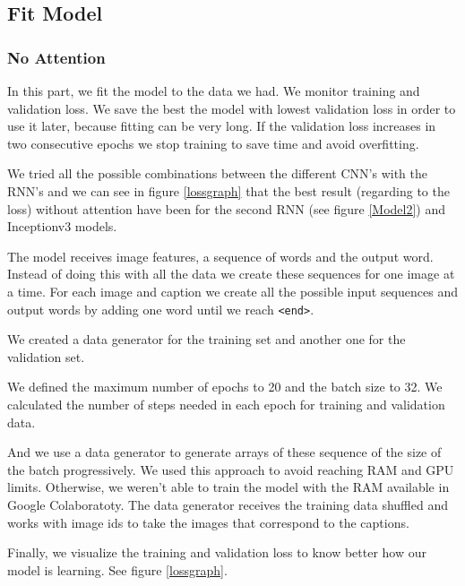 \documentclass{article} %
\begin{document}
\subsection{Fit Model}

\subsubsection{No Attention}

In this part, we fit the model to the data we had. We monitor training and validation loss. We save the best the model with lowest validation loss in order to use it later, because fitting can be very long. If the validation loss increases in two consecutive epochs we stop training to save time and avoid overfitting.

We tried all the possible combinations between the different CNN's with the RNN's and we can see in figure \ref{lossgraph} that the best result (regarding to the loss) without attention have been for the second RNN (see figure \ref{Model2}) and Inceptionv3 models. 

The model receives image features, a sequence of words and the output word. Instead of doing this with all the data we create these sequences for one image at a time. For each image and caption we create all the possible input sequences and output words by adding one word until we reach \texttt{<end>}.

We created a data generator for the training set and another one for the validation set.

We defined the maximum number of epochs to 20 and the batch size to 32. We calculated the number of steps needed in each epoch for training and validation data.

And we use a data generator to generate arrays of these sequence of the size of the batch progressively. We used this approach to avoid reaching RAM and GPU limits. Otherwise, we weren't able to train the model with the RAM available in Google Colaboratoty. The data generator receives the training data shuffled and works with image ids to take the images that correspond to the captions.

Finally, we visualize the training and validation loss to know better how our model is learning. See figure \ref{lossgraph}.
\end{document}
